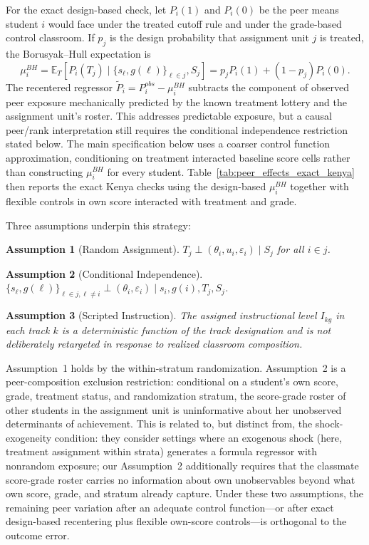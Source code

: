 \documentclass[11pt]{article}
\newtheorem{assumption}{Assumption}
\newcommand{\E}{\mathbb{E}}
\begin{document}
For the exact design-based check, let $P_i(1)$ and $P_i(0)$ be the peer means student $i$ would face under the treated cutoff rule and under the grade-based control classroom. If $p_j$ is the design probability that assignment unit $j$ is treated, the Borusyak--Hull expectation is
\begin{equation}
\mu_i^{BH} = \E_T[P_i(T_j) \mid \{s_\ell,g(\ell)\}_{\ell \in j}, S_j] = p_j P_i(1) + (1-p_j)P_i(0).
\end{equation}
The recentered regressor $\tilde{P}_i = P_i^{obs} - \mu_i^{BH}$ subtracts the component of observed peer exposure mechanically predicted by the known treatment lottery and the assignment unit's roster. This addresses predictable exposure, but a causal peer/rank interpretation still requires the conditional independence restriction stated below. The main specification below uses a coarser control function approximation, conditioning on treatment interacted baseline score cells rather than constructing $\mu_i^{BH}$ for every student. Table~\ref{tab:peer_effects_exact_kenya} then reports the exact Kenya checks using the design-based $\mu_i^{BH}$ together with flexible controls in own score interacted with treatment and grade.

Three assumptions underpin this strategy:

\begin{assumption}[Random Assignment]
$T_j \perp (\theta_i, u_i, \varepsilon_i) \mid S_j$ for all $i \in j$.
\end{assumption}

\begin{assumption}[Conditional Independence]
$\{s_\ell,g(\ell)\}_{\ell \in j, \ell \neq i} \perp (\theta_i, \varepsilon_i) \mid s_i, g(i), T_j, S_j$.
\end{assumption}

\begin{assumption}[Scripted Instruction]
The assigned instructional level $I_{kg}$ in each track $k$ is a deterministic function of the track designation and is not deliberately retargeted in response to realized classroom composition.
\end{assumption}

\noindent Assumption~1 holds by the within-stratum randomization. Assumption~2 is a peer-composition exclusion restriction: conditional on a student's own score, grade, treatment status, and randomization stratum, the score-grade roster of other students in the assignment unit is uninformative about her unobserved determinants of achievement. This is related to, but distinct from, the \citet{borusyak2023nonrandom} shock-exogeneity condition: they consider settings where an exogenous shock (here, treatment assignment within strata) generates a formula regressor with nonrandom exposure; our Assumption~2 additionally requires that the classmate score-grade roster carries no information about own unobservables beyond what own score, grade, and stratum already capture. Under these two assumptions, the remaining peer variation after an adequate control function---or after exact design-based recentering plus flexible own-score controls---is orthogonal to the outcome error.
\end{document}
